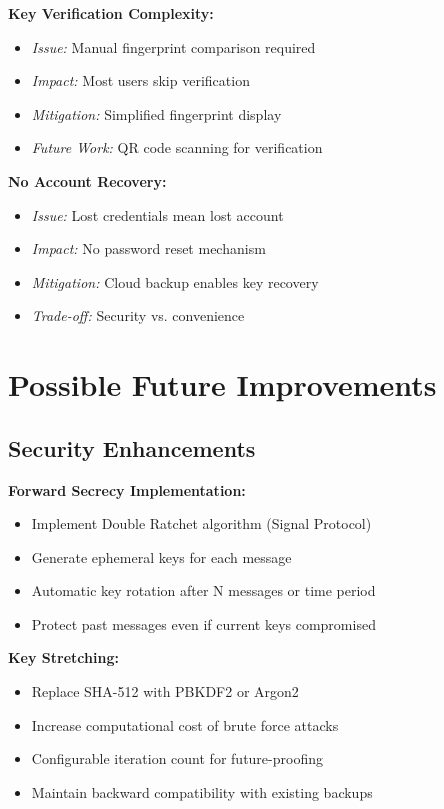 \textbf{Key Verification Complexity:}
\begin{itemize}
    \item \textit{Issue:} Manual fingerprint comparison required
    \item \textit{Impact:} Most users skip verification
    \item \textit{Mitigation:} Simplified fingerprint display
    \item \textit{Future Work:} QR code scanning for verification
\end{itemize}

\textbf{No Account Recovery:}
\begin{itemize}
    \item \textit{Issue:} Lost credentials mean lost account
    \item \textit{Impact:} No password reset mechanism
    \item \textit{Mitigation:} Cloud backup enables key recovery
    \item \textit{Trade-off:} Security vs. convenience
\end{itemize}

\section{Possible Future Improvements}

\subsection{Security Enhancements}

\textbf{Forward Secrecy Implementation:}
\begin{itemize}
    \item Implement Double Ratchet algorithm (Signal Protocol)
    \item Generate ephemeral keys for each message
    \item Automatic key rotation after N messages or time period
    \item Protect past messages even if current keys compromised
\end{itemize}

\textbf{Key Stretching:}
\begin{itemize}
    \item Replace SHA-512 with PBKDF2 or Argon2
    \item Increase computational cost of brute force attacks
    \item Configurable iteration count for future-proofing
    \item Maintain backward compatibility with existing backups
\end{itemize}

